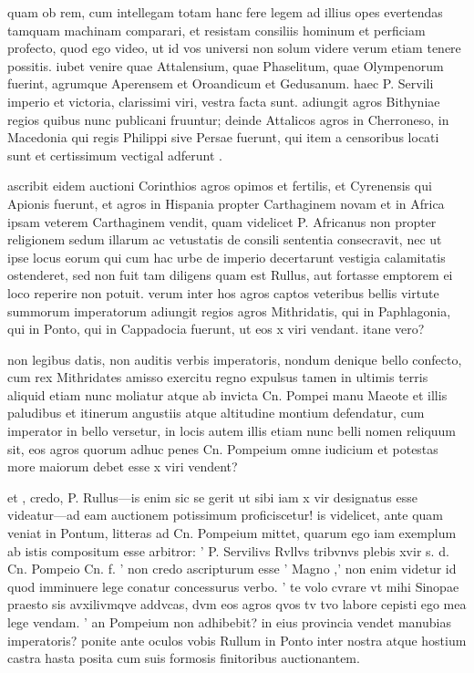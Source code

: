  quam ob rem, cum intellegam totam hanc fere legem ad illius opes evertendas tamquam machinam comparari, et resistam consiliis hominum et perficiam profecto, quod ego video, ut id vos universi non solum videre verum etiam tenere possitis. iubet venire quae Attalensium, quae Phaselitum, quae Olympenorum fuerint, agrumque Aperensem et Oroandicum et Gedusanum. haec P. Servili imperio et victoria, clarissimi viri, vestra facta sunt. adiungit agros Bithyniae regios quibus nunc publicani fruuntur; deinde Attalicos agros in Cherroneso, in Macedonia qui regis Philippi sive Persae fuerunt, qui item a censoribus locati sunt et certissimum vectigal adferunt .

 ascribit eidem auctioni Corinthios agros opimos et fertilis, et Cyrenensis qui Apionis fuerunt, et agros in Hispania propter Carthaginem novam et in Africa ipsam veterem Carthaginem vendit, quam videlicet P. Africanus non propter religionem sedum illarum ac vetustatis de consili sententia consecravit, nec ut ipse locus eorum qui cum hac urbe de imperio decertarunt vestigia calamitatis ostenderet, sed non fuit tam diligens quam est Rullus, aut fortasse emptorem ei loco reperire non potuit. verum inter hos agros captos veteribus bellis virtute summorum imperatorum adiungit regios agros Mithridatis, qui in Paphlagonia, qui in Ponto, qui in Cappadocia fuerunt, ut eos x viri vendant. itane vero?

 non legibus datis, non auditis verbis imperatoris, nondum denique bello confecto, cum rex Mithridates amisso exercitu regno expulsus tamen in ultimis terris aliquid etiam nunc moliatur atque ab invicta Cn. Pompei manu Maeote et illis paludibus et itinerum angustiis atque altitudine montium defendatur, cum imperator in bello versetur, in locis autem illis etiam nunc belli nomen reliquum sit, eos agros quorum adhuc penes Cn. Pompeium omne iudicium et potestas more maiorum debet esse x viri vendent?

 et , credo, P. Rullus—is enim sic se gerit ut sibi iam x vir designatus esse videatur—ad eam auctionem potissimum proficiscetur! is videlicet, ante quam veniat in Pontum, litteras ad Cn. Pompeium mittet, quarum ego iam exemplum ab istis compositum esse arbitror: ' P. Servilivs Rvllvs tribvnvs plebis xvir s. d. Cn. Pompeio Cn. f. ' non credo ascripturum esse ' Magno ,' non enim videtur id quod imminuere lege conatur concessurus verbo. ' te volo cvrare vt mihi Sinopae praesto sis avxilivmqve addvcas, dvm eos agros qvos tv tvo labore cepisti ego mea lege vendam. ' an Pompeium non adhibebit? in eius provincia vendet manubias imperatoris? ponite ante oculos vobis Rullum in Ponto inter nostra atque hostium castra hasta posita cum suis formosis finitoribus auctionantem.

